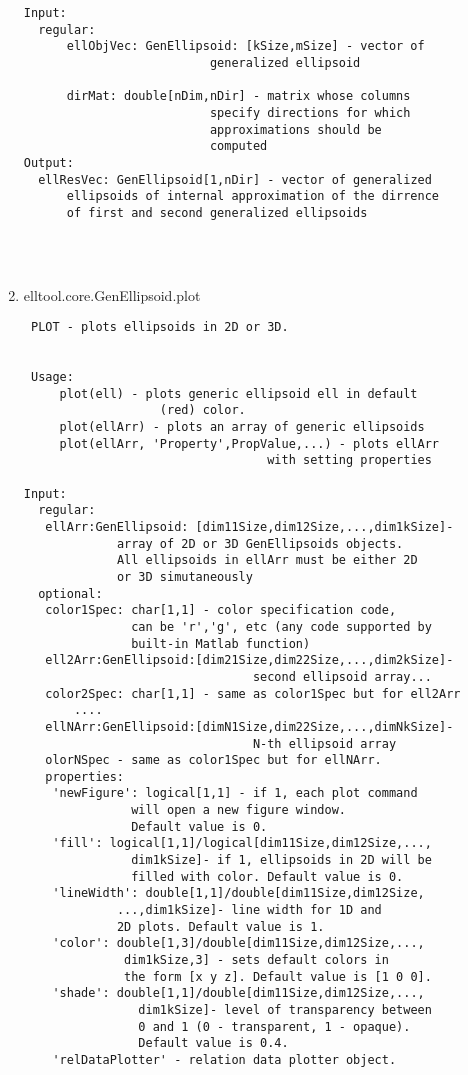 \begin{enumerate}
\begin{lstlisting}
Input:
  regular:
      ellObjVec: GenEllipsoid: [kSize,mSize] - vector of
                          generalized ellipsoid

      dirMat: double[nDim,nDir] - matrix whose columns
                          specify directions for which
                          approximations should be
                          computed
Output:
  ellResVec: GenEllipsoid[1,nDir] - vector of generalized
      ellipsoids of internal approximation of the dirrence
      of first and second generalized ellipsoids




\end{lstlisting}
\fontfamily{\familydefault}
\selectfont
\item {elltool.core.GenEllipsoid.plot}
\selectfont
\begin{lstlisting}
 PLOT - plots ellipsoids in 2D or 3D.


 Usage:
     plot(ell) - plots generic ellipsoid ell in default
                   (red) color.
     plot(ellArr) - plots an array of generic ellipsoids
     plot(ellArr, 'Property',PropValue,...) - plots ellArr
                                  with setting properties

Input:
  regular:
   ellArr:GenEllipsoid: [dim11Size,dim12Size,...,dim1kSize]-
             array of 2D or 3D GenEllipsoids objects.
             All ellipsoids in ellArr must be either 2D
             or 3D simutaneously
  optional:
   color1Spec: char[1,1] - color specification code,
               can be 'r','g', etc (any code supported by
               built-in Matlab function)
   ell2Arr:GenEllipsoid:[dim21Size,dim22Size,...,dim2kSize]-
                                second ellipsoid array...
   color2Spec: char[1,1] - same as color1Spec but for ell2Arr
       ....
   ellNArr:GenEllipsoid:[dimN1Size,dim22Size,...,dimNkSize]-
                                N-th ellipsoid array
   olorNSpec - same as color1Spec but for ellNArr.
   properties:
    'newFigure': logical[1,1] - if 1, each plot command
               will open a new figure window.
               Default value is 0.
    'fill': logical[1,1]/logical[dim11Size,dim12Size,...,
               dim1kSize]- if 1, ellipsoids in 2D will be
               filled with color. Default value is 0.
    'lineWidth': double[1,1]/double[dim11Size,dim12Size,
             ...,dim1kSize]- line width for 1D and
             2D plots. Default value is 1.
    'color': double[1,3]/double[dim11Size,dim12Size,...,
              dim1kSize,3] - sets default colors in
              the form [x y z]. Default value is [1 0 0].
    'shade': double[1,1]/double[dim11Size,dim12Size,...,
                dim1kSize]- level of transparency between
                0 and 1 (0 - transparent, 1 - opaque).
                Default value is 0.4.
    'relDataPlotter' - relation data plotter object.


\end{lstlisting}
\end{enumerate}
